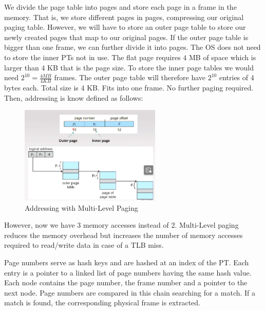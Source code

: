 \documentclass[a4paper]{article}
\theoremstyle{plain}
\theoremstyle{definition}
\newtheorem{defn}{Definition}[section]
\theoremstyle{remark}
\begin{document}
\begin{tcolorbox}[colback=black!3!white,colframe=black!60!white,title=\begin{defn}Hierarchal Multi-level paging tables \label{Hierarchal Multi-level paging tables}\end{defn}]
We divide the page table into pages and store each page in a frame in the memory. That is, we store different pages in pages, compressing our original paging table. However, we will have to store an outer page table to store our newly created pages that map to our original pages. If the outer page table is bigger than one frame, we can further divide it into pages. The OS does not need to store the inner PTs not in use. The flat page requires $4$ MB of space which is larger than $4$ KB that is the page size. To store the inner page tables we would need $2^{10}=\frac{4MB}{4KB}$ frames. The outer page table will therefore have $2^{10}$ entries of $4$ bytes each. Total size is $4$ KB. Fits into one frame. No further paging required. Then, addressing is know defined as follows:
\begin{figure}[H]
	\centering
	\includegraphics[width=0.6\textwidth]{seventyseven.png}
	\caption{Addressing with Multi-Level Paging}
	\label{fig:seventyseven-png}
\end{figure}
However, now we have 3 memory accesses instead of $2$. Multi-Level paging reduces the memory overhead but increases the number of memory accesses required to read/write data in case of a TLB miss. 
\end{tcolorbox}
\begin{tcolorbox}[colback=black!3!white,colframe=black!60!white,title=\begin{defn}Hashed Table Maps \label{Hashed Table Maps}\end{defn}]
Page numbers serve as hash keys and are hashed at an index of the PT. Each entry is a pointer to a linked list of page numbers having the same hash value. Each node contains the page number, the frame number and a pointer to the next node. Page numbers are compared in this chain searching for a match. If a match is found, the corresponding physical frame is extracted.
\end{tcolorbox}
\end{document}
